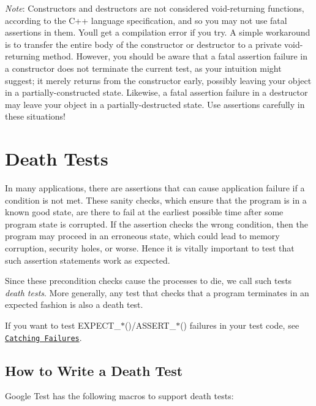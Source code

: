 {\itshape Note}\+: Constructors and destructors are not considered void-\/returning functions, according to the C++ language specification, and so you may not use fatal assertions in them. You\textquotesingle{}ll get a compilation error if you try. A simple workaround is to transfer the entire body of the constructor or destructor to a private void-\/returning method. However, you should be aware that a fatal assertion failure in a constructor does not terminate the current test, as your intuition might suggest; it merely returns from the constructor early, possibly leaving your object in a partially-\/constructed state. Likewise, a fatal assertion failure in a destructor may leave your object in a partially-\/destructed state. Use assertions carefully in these situations!

\section*{Death Tests}

In many applications, there are assertions that can cause application failure if a condition is not met. These sanity checks, which ensure that the program is in a known good state, are there to fail at the earliest possible time after some program state is corrupted. If the assertion checks the wrong condition, then the program may proceed in an erroneous state, which could lead to memory corruption, security holes, or worse. Hence it is vitally important to test that such assertion statements work as expected.

Since these precondition checks cause the processes to die, we call such tests {\itshape death tests}. More generally, any test that checks that a program terminates in an expected fashion is also a death test.

If you want to test {\ttfamily E\+X\+P\+E\+C\+T\+\_\+$\ast$()/\+A\+S\+S\+E\+R\+T\+\_\+$\ast$()} failures in your test code, see \href{#catching-failures}{\tt Catching Failures}.

\subsection*{How to Write a Death Test}

Google Test has the following macros to support death tests\+:

